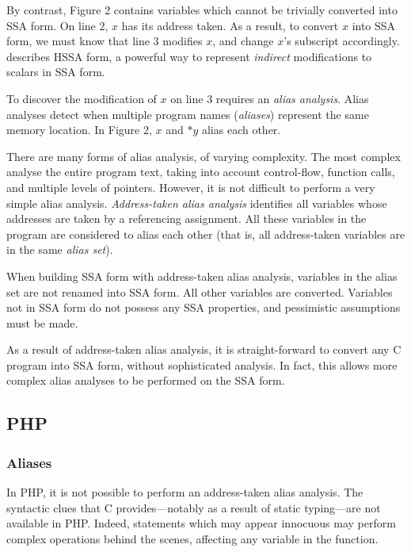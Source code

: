 By contrast, Figure 2 contains variables which cannot be trivially converted into SSA form.
On line 2, $x$ has its address taken.
As a result, to convert $x$ into SSA form, we must know that line 3 modifies $x$, and change $x$'s subscript accordingly.
 describes HSSA form, a powerful way to represent \textit{indirect} modifications to scalars in SSA form.

To discover the modification of $x$ on line 3 requires an \textit{alias analysis}.
Alias analyses detect when multiple program names (\textit{aliases}) represent the same memory location.
In Figure 2, $x$ and $*y$ alias each other.

There are many forms of alias analysis, of varying complexity.
The most complex analyse the entire program text, taking into account control-flow, function calls, and multiple levels of pointers.
However, it is not difficult to perform a very simple alias analysis.
\textit{Address-taken alias analysis} identifies all variables whose addresses are taken by a referencing assignment.
All these variables in the program are considered to alias each other (that is, all address-taken variables are in the same \textit{alias set}).

When building SSA form with address-taken alias analysis, variables in the alias set are not renamed into SSA form.
All other variables are converted.
Variables not in SSA form do not possess any SSA properties, and pessimistic assumptions must be made.

As a result of address-taken alias analysis, it is straight-forward to convert any C program into SSA form, without sophisticated analysis.
In fact, this allows more complex alias analyses to be performed on the SSA form.

\subsection{PHP}

\subsubsection{Aliases}

In PHP, it is not possible to perform an address-taken alias analysis.
The syntactic clues that C provides---notably as a result of static typing---are not available in PHP.
Indeed, statements which may appear innocuous may perform complex operations behind the scenes, affecting any variable in the function.

